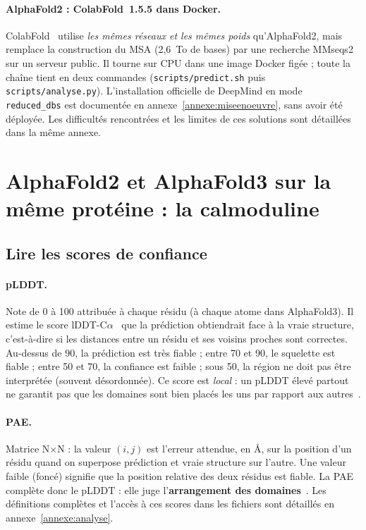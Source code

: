 \paragraph{AlphaFold2 : ColabFold~1.5.5 dans Docker.} ColabFold~\cite{mirdita2022} utilise \emph{les mêmes réseaux et les mêmes poids} qu'AlphaFold2, mais remplace la construction du MSA (2,6~To de bases) par une recherche MMseqs2~\cite{steinegger2017} sur un serveur public. Il tourne sur CPU dans une image Docker figée ; toute la chaîne tient en deux commandes (\texttt{scripts/predict.sh} puis \texttt{scripts/analyse.py}). L'installation officielle de DeepMind en mode \texttt{reduced\_dbs} est documentée en annexe~\ref{annexe:miseenoeuvre}, sans avoir été déployée. Les difficultés rencontrées et les limites de ces solutions sont détaillées dans la même annexe.


\section{AlphaFold2 et AlphaFold3 sur la même protéine : la calmoduline}
\label{sec:af3}

\subsection{Lire les scores de confiance}
\label{sec:analyse}

\paragraph{pLDDT.} Note de 0 à 100 attribuée à chaque résidu (à chaque atome dans AlphaFold3). Il estime le score lDDT-C$\alpha$~\cite{mariani2013} que la prédiction obtiendrait face à la vraie structure, c'est-à-dire si les distances entre un résidu et ses voisins proches sont correctes. Au-dessus de 90, la prédiction est très fiable ; entre 70 et 90, le squelette est fiable ; entre 50 et 70, la confiance est faible ; sous 50, la région ne doit pas être interprétée (souvent désordonnée). Ce score est \emph{local} : un pLDDT élevé partout ne garantit pas que les domaines sont bien placés les uns par rapport aux autres~\cite{jumper2021,ebi_course}.

\paragraph{PAE.} Matrice N$\times$N : la valeur $(i,j)$ est l'erreur attendue, en Å, sur la position d'un résidu quand on superpose prédiction et vraie structure sur l'autre. Une valeur faible (foncé) signifie que la position relative des deux résidus est fiable. La PAE complète donc le pLDDT : elle juge l'\textbf{arrangement des domaines}~\cite{ebi_course}. Les définitions complètes et l'accès à ces scores dans les fichiers sont détaillés en annexe~\ref{annexe:analyse}.

